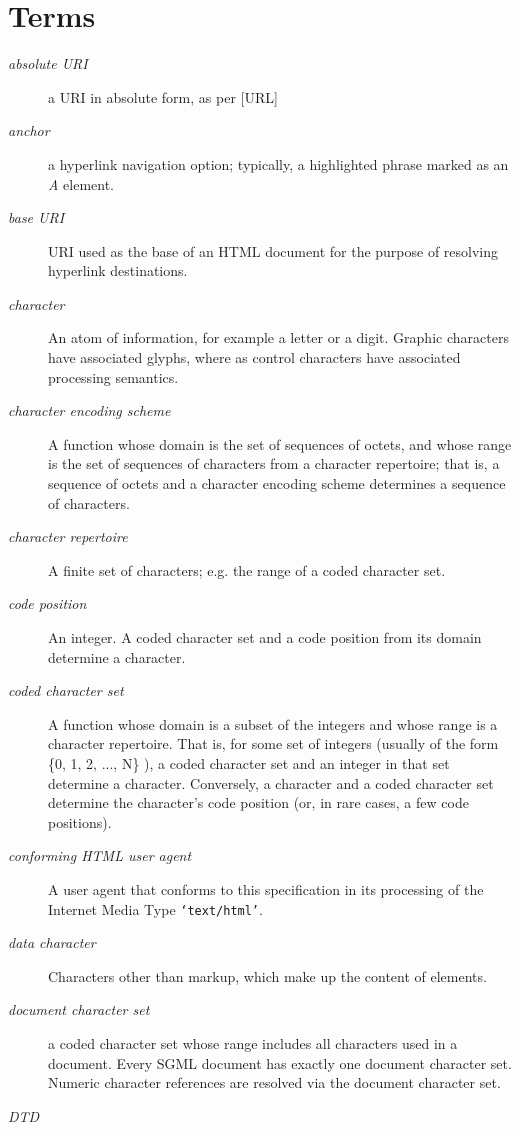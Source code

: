 \section*{Terms}\begin{description}\item[{\it absolute URI}]
a URI in absolute form, as per [URL]
\item[{\it anchor}]
a hyperlink navigation option;  typically, a highlighted
phrase marked as an {\it A} element.
\item[{\it base URI}]
URI used as the base of an HTML document for the
purpose of resolving hyperlink destinations.
\item[{\it character}]
An atom of information, for example a letter or a
digit.  Graphic characters have associated glyphs, where as control
characters have associated processing semantics.
\item[{\it character encoding scheme}]
A function whose domain is the set of
sequences of octets, and whose range is the set of sequences of
characters from a character repertoire;  that is, a sequence of octets
and a character encoding scheme determines a sequence of characters.
\item[{\it character repertoire}]
A finite set of characters;  e.g.  the range
of a coded character set.
\item[{\it code position}]
An integer.  A coded character set and a code
position from its domain determine a character.
\item[{\it coded character set}]
A function whose domain is a subset of the
integers and whose range is a character repertoire.  That is, for some
set of integers (usually of the form \{0, 1, 2, ..., N\} ), a coded
character set and an integer in that set determine a
character.  Conversely, a character and a coded character set determine
the character's code position (or, in rare cases, a few code
positions).
\item[{\it conforming HTML user agent}]
A user agent that conforms to this
specification in its processing of the Internet Media Type
{\tt `text/html'}.
\item[{\it data character}]
Characters other than markup, which make up the
content of elements.
\item[{\it document character set}]
a coded character set whose range
includes all characters used in a document.  Every SGML document has
exactly one document character set.  Numeric character references are
resolved via the document character set.
\item[{\it DTD}]

\end{description}
